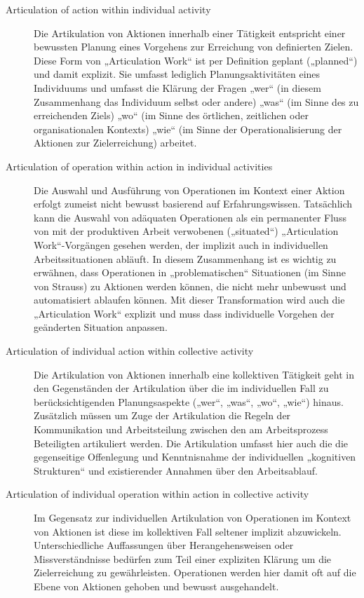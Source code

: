 \begin{description}
	\item[Articulation of action within individual activity] Die Artikulation von Aktionen innerhalb einer Tätigkeit entspricht einer bewussten Planung eines Vorgehens zur Erreichung von definierten Zielen. Diese Form von „Articulation Work“ ist per Definition geplant („planned“) und damit explizit. Sie umfasst lediglich Planungsaktivitäten eines Individuums und umfasst die Klärung der Fragen „wer“ (in diesem Zusammenhang das Individuum selbst oder andere) „was“ (im Sinne des zu erreichenden Ziels) „wo“ (im Sinne des örtlichen, zeitlichen oder organisationalen Kontexts) „wie“ (im Sinne der Operationalisierung der Aktionen zur Zielerreichung) arbeitet.
	\item[Articulation of operation within action in individual activities] Die Auswahl und Ausführung von Operationen im Kontext einer Aktion erfolgt zumeist nicht bewusst basierend auf Erfahrungswissen. Tatsächlich kann die Auswahl von adäquaten Operationen als ein permanenter Fluss von mit der produktiven Arbeit verwobenen („situated“) „Articulation Work“-Vorgängen gesehen werden, der implizit auch in individuellen Arbeitssituationen abläuft. In diesem Zusammenhang ist es wichtig zu erwähnen, dass Operationen in „problematischen“ Situationen (im Sinne von Strauss) zu Aktionen werden können, die nicht mehr unbewusst und automatisiert ablaufen können. Mit dieser Transformation wird auch die „Articulation Work“ explizit und muss dass individuelle Vorgehen der geänderten Situation anpassen. 
	\item[Articulation of individual action within collective activity] Die Artikulation von Aktionen innerhalb eine kollektiven Tätigkeit geht in den Gegenständen der Artikulation über die im individuellen Fall zu berücksichtigenden Planungsaspekte („wer“, „was“, „wo“, „wie“) hinaus. Zusätzlich müssen um Zuge der Artikulation die Regeln der Kommunikation und Arbeitsteilung zwischen den am Arbeitsprozess Beteiligten artikuliert werden. Die Artikulation umfasst hier auch die die gegenseitige Offenlegung und Kenntnisnahme der individuellen „kognitiven Strukturen“ und existierender Annahmen über den Arbeitsablauf.
	\item[Articulation of individual operation within action in collective activity] Im Gegensatz zur individuellen Artikulation von Operationen im Kontext von Aktionen ist diese im kollektiven Fall seltener implizit abzuwickeln. Unterschiedliche Auffassungen über Herangehensweisen oder Missverständnisse bedürfen zum Teil einer expliziten Klärung  um die Zielerreichung zu gewährleisten. Operationen werden hier damit oft auf die Ebene von Aktionen gehoben und bewusst ausgehandelt.

\end{description}
